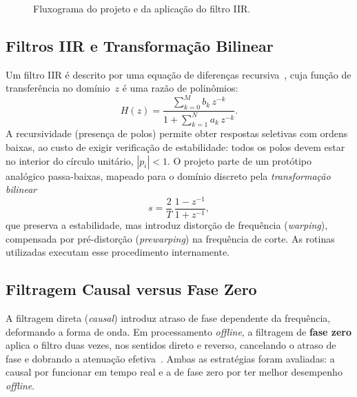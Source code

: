 \begin{figure}[H]
\centering
{}
\caption{Fluxograma do projeto e da aplicação do filtro IIR.}
\label{fig:flowchart}
\end{figure}

\subsection{Filtros IIR e Transformação Bilinear}
Um filtro IIR é descrito por uma equação de diferenças recursiva~\cite{oppenheim2009},
cuja função de transferência no domínio~$z$ é uma razão de polinômios:
\begin{equation}
H(z) = \frac{\sum_{k=0}^{M} b_k\,z^{-k}}{1 + \sum_{k=1}^{N} a_k\,z^{-k}}.
\label{eq:Hz}
\end{equation}
A recursividade (presença de polos) permite obter respostas seletivas com ordens
baixas, ao custo de exigir verificação de estabilidade: todos os polos devem
estar no interior do círculo unitário, $|p_i| < 1$. O projeto parte de um
protótipo analógico passa-baixas, mapeado para o domínio discreto pela
\emph{transformação bilinear}
\begin{equation}
s = \frac{2}{T}\,\frac{1 - z^{-1}}{1 + z^{-1}},
\end{equation}
que preserva a estabilidade, mas introduz distorção de frequência
(\emph{warping}), compensada por pré-distorção (\emph{prewarping}) na frequência
de corte. As rotinas utilizadas executam esse procedimento internamente.

\subsection{Filtragem Causal versus Fase Zero}
A filtragem direta (\emph{causal}) introduz atraso de fase dependente da
frequência, deformando a forma de onda. Em processamento \emph{offline}, a
filtragem de \textbf{fase zero} aplica o filtro duas vezes, nos sentidos direto e
reverso, cancelando o atraso de fase e dobrando a atenuação efetiva~\cite{gustafsson}.
Ambas as estratégias foram avaliadas: a causal por funcionar em tempo real e a de
fase zero por ter melhor desempenho \emph{offline}.

